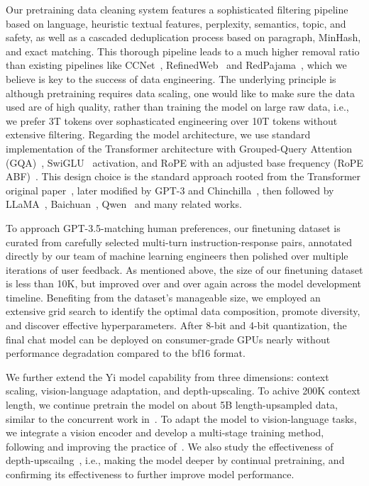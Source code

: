 Our pretraining data cleaning system features a sophisticated filtering pipeline based on language, heuristic textual features, perplexity, semantics, topic, and safety, as well as a cascaded deduplication process based on paragraph, MinHash, and exact matching. 
This thorough pipeline leads to a much higher removal ratio than existing pipelines like CCNet~\citep{wenzek2019ccnet}, RefinedWeb~\citep{penedo2023refinedweb} and RedPajama~\citep{together2023redpajama}, which we believe is key to the success of data engineering.
The underlying principle is although pretraining requires data scaling, one would like to make sure the data used are of high quality, rather than training the model on large raw data, i.e.,  
we prefer 3T tokens over sophasticated engineering over 10T tokens without extensive filtering. 
Regarding the model architecture, we use standard implementation of the Transformer architecture with Grouped-Query Attention (GQA)~\citep{gqa}, SwiGLU~\citep{swiglu} activation, and RoPE with an adjusted base frequency (RoPE ABF)~\citep{xiong2023effective}.
This design choice is the standard approach rooted from the Transformer original paper~\citep{Vaswani:2017aa}, later modified by GPT-3 and Chinchilla~\citep{hoffmann2022training}, then followed by LLaMA~\citep{llama2}, Baichuan~\citep{Yang:2023aa}, Qwen~\citep{Bai:2023aa} and many related works. 


To approach GPT-3.5-matching human preferences, our finetuning dataset is curated from carefully selected multi-turn instruction-response pairs, annotated directly by our team of machine learning engineers then polished over multiple iterations of user feedback.
As mentioned above, the size of our finetuning dataset is less than 10K, but improved over and over again across the model development timeline. 
Benefiting from the dataset's manageable size, we employed an extensive grid search to identify the optimal data composition, promote diversity, and discover effective hyperparameters. 
After 8-bit and 4-bit quantization, the final chat model can be deployed on consumer-grade GPUs nearly without performance degradation compared to the bf16 format.

We further extend the Yi model capability from three dimensions: context scaling, vision-language adaptation, and depth-upscaling. 
To achive 200K context length, we continue pretrain the model on about 5B length-upsampled data, similar to the concurrent work in~\citet{fu2024data}. 
To adapt the model to vision-language tasks, we integrate a vision encoder and develop a multi-stage training method, following and improving the practice of~\citet{liu2023visual}. 
We also study the effectiveness of depth-upscailng~\citep{kim2023solar}, i.e., making the model deeper by continual pretraining, and confirming its effectiveness to further improve model performance.


